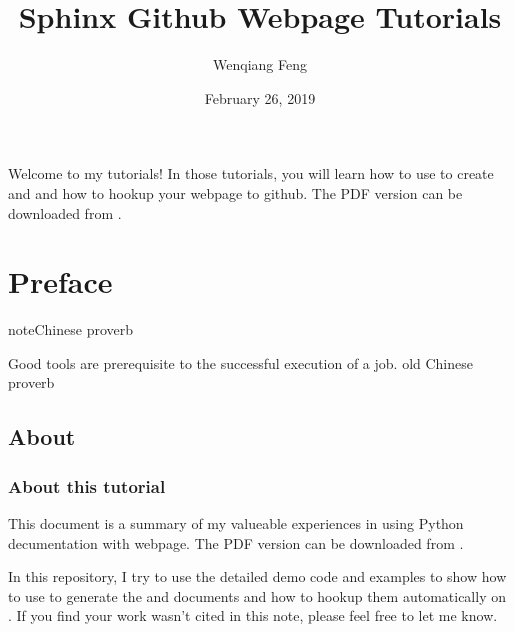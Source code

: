 \documentclass[letterpaper,12pt,english]{sphinxmanual}
\title{Sphinx Github Webpage Tutorials}
\date{February 26, 2019}
\author{Wenqiang Feng}
\begin{document}
\pagestyle{empty}
\sphinxmaketitle
\pagestyle{plain}
\sphinxtableofcontents
\pagestyle{normal}
\label{\detokenize{index::doc}}\begin{quote}

\begin{figure}[htbp]
\centering

\noindent{}
\end{figure}
\end{quote}

Welcome to my  tutorials! In those tutorials, you will learn how to use  to create  and  and how to hookup your  webpage to github. The PDF version can be downloaded from .




\chapter{Preface}
\label{\detokenize{preface:preface}}\label{\detokenize{preface:id1}}\label{\detokenize{preface::doc}}
\begin{sphinxadmonition}{note}{Chinese proverb}

Good tools are prerequisite to the successful execution of a job. \textendash{} old Chinese proverb
\end{sphinxadmonition}


\section{About}
\label{\detokenize{preface:about}}

\subsection{About this tutorial}
\label{\detokenize{preface:about-this-tutorial}}
This document is a summary of my valueable experiences in using Python decumentation  with  webpage. The PDF version can be downloaded from . 

In this repository, I try to use the detailed demo code and
examples to show how to use  to generate the  and  documents and how to hookup them automatically on . If you find your work wasn’t cited in this note, please feel free to let me know.
\end{document}
